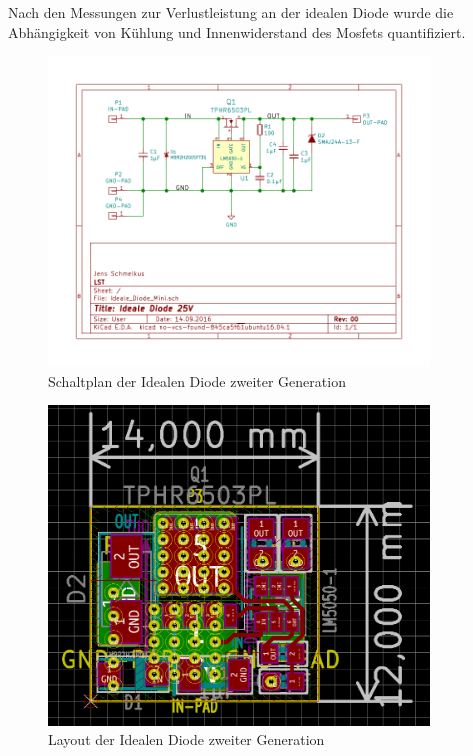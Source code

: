Nach den Messungen zur Verlustleistung an der idealen Diode wurde die Abhängigkeit von Kühlung und Innenwiderstand des Mosfets quantifiziert. 


\begin{figure}[H]
\centering
\includegraphics[width=0.9\textwidth]{Schaltplaene/Ideale_Diode_25V_rev00-ver00.pdf} 
\caption{Schaltplan der Idealen Diode zweiter Generation} 
\label{fig:Schaltplan der Idealen Diode zweiter Generation}
\end{figure}


\begin{figure}[H]
\centering
\includegraphics[width=0.9\textwidth]{bilder/Ideale_Diode/Ideale_Diode_25V_rev00_ver00.png} 
\caption{Layout der Idealen Diode zweiter Generation} 
\label{fig:Layout der Idealen Diode zweiter Generation}
\end{figure}



